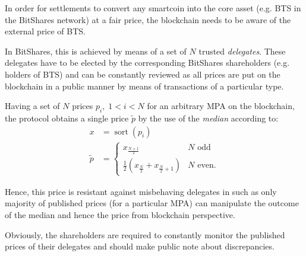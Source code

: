 In order for settlements to convert any smartcoin into the core asset (e.g. BTS
in the BitShares network) at a fair price, the blockchain needs to be aware of
the external price of BTS.

In BitShares, this is achieved by means of a set of $N$ trusted
\emph{delegates}. These delegates have to be elected by the corresponding
BitShares shareholders (e.g. holders of BTS) and can be constantly reviewed as
all prices are put on the blockchain in a public manner by means of
transactions of a particular type.

Having a set of $N$ prices $p_i,\;1<i<N$ for an arbitrary MPA on the
blockchain, the protocol obtains a single price $\tilde{p}$ by the use of the
\emph{median} according to:
\begin{align}
 x &= \operatorname{sort}(p_{i})\\
 \tilde p &=\begin{cases}
   x_\frac{N+1}{2}                                                & N \text{ odd}\\
   \frac {1}{2}\left(x_{\frac{N}{2}} + x_{\frac{N}{2} + 1}\right) & N \text{ even.}
 \end{cases}
\end{align}

Hence, this price is resistant against misbehaving delegates in such as only
majority of published prices (for a particular MPA) can manipulate the outcome
of the median and hence the price from blockchain perspective.

Obviously, the shareholders are required to constantly monitor the published
prices of their delegates and should make public note about discrepancies. 
